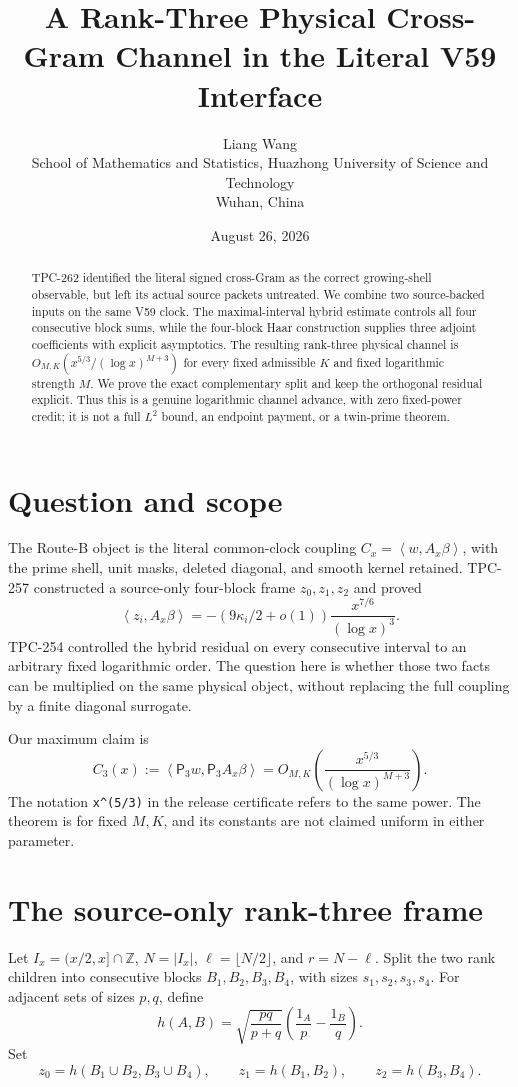 \documentclass[11pt]{article}
\title{A Rank-Three Physical Cross-Gram Channel in the Literal V59 Interface}
\author{Liang Wang\\
School of Mathematics and Statistics, Huazhong University of Science and Technology\\
Wuhan, China}
\date{August 26, 2026}
\newcommand{\ip}[2]{\left\langle #1,#2\right\rangle}
\newcommand{\PP}{\mathsf P_3}
\begin{document}
\maketitle
\begin{abstract}
TPC-262 identified the literal signed cross-Gram as the correct growing-shell
observable, but left its actual source packets untreated.  We combine two
source-backed inputs on the same V59 clock.  The maximal-interval hybrid
estimate controls all four consecutive block sums, while the four-block Haar
construction supplies three adjoint coefficients with explicit asymptotics.
The resulting rank-three physical channel is
\(O_{M,K}(x^{5/3}/(\log x)^{M+3})\) for every fixed admissible \(K\) and
fixed logarithmic strength \(M\).  We prove the exact complementary split and
keep the orthogonal residual explicit.  Thus this is a genuine logarithmic
channel advance, with zero fixed-power credit; it is not a full \(L^2\) bound,
an endpoint payment, or a twin-prime theorem.
\end{abstract}

\section{Question and scope}
The Route-B object is the literal common-clock coupling
\(C_x=\ip{w}{A_x\beta}\), with the prime shell, unit masks, deleted diagonal,
and smooth kernel retained.  TPC-257 constructed a source-only four-block
frame \(z_0,z_1,z_2\) and proved
\[
 \ip{z_i}{A_x\beta}=-(9\kappa_i/2+o(1))\frac{x^{7/6}}{(\log x)^3}.
\]
TPC-254 controlled the hybrid residual on every consecutive interval to an
arbitrary fixed logarithmic order.  The question here is whether those two
facts can be multiplied on the same physical object, without replacing the
full coupling by a finite diagonal surrogate.

Our maximum claim is
\begin{equation*}
 \boxed{C_3(x):=\ip{\PP w}{\PP A_x\beta}
   =O_{M,K}\!\left(\frac{x^{5/3}}{(\log x)^{M+3}}\right)}.
\end{equation*}
The notation \texttt{x\string^(5/3)} in the release certificate refers to the
same power.  The theorem is for fixed \(M,K\), and its constants are not
claimed uniform in either parameter.

\section{The source-only rank-three frame}
Let \(I_x=(x/2,x]\cap\mathbb Z\), \(N=|I_x|\),
\(\ell=\lfloor N/2\rfloor\), and \(r=N-\ell\).  Split the two rank
children into consecutive blocks \(B_1,B_2,B_3,B_4\), with sizes
\(s_1,s_2,s_3,s_4\).  For adjacent sets of sizes \(p,q\), define
\[
 h(A,B)=\sqrt{\frac{pq}{p+q}}\left(\frac{1_A}{p}-\frac{1_B}{q}\right).
\]
Set
\[
 z_0=h(B_1\cup B_2,B_3\cup B_4),\qquad
 z_1=h(B_1,B_2),\qquad z_2=h(B_3,B_4).
\]
\end{document}
